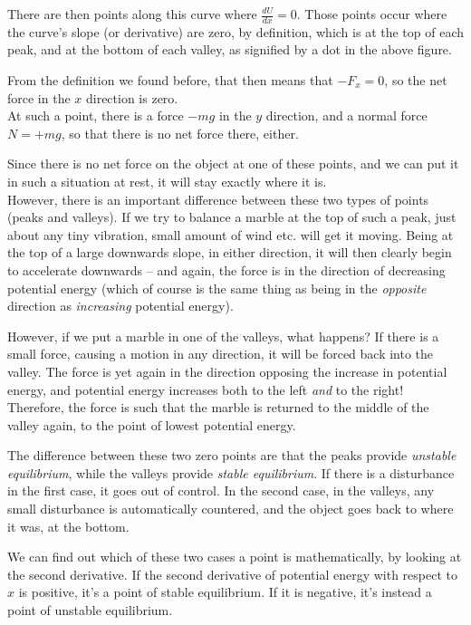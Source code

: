 \documentclass[8.01x]{subfiles}
\begin{document}
There are then points along this curve where $\displaystyle \frac{dU}{dx} = 0$. Those points occur where the curve's slope (or derivative) are zero, by definition, which is at the top of each peak, and at the bottom of each valley, as signified by a dot in the above figure.

From the definition we found before, that then means that $-F_x = 0$, so the net force in the $x$ direction is zero.\\
At such a point, there is a force $-m g$ in the $y$ direction, and a normal force $N = + m g$, so that there is no net force there, either.

Since there is no net force on the object at one of these points, and we can put it in such a situation at rest, it will stay exactly where it is.\\
However, there is an important difference between these two types of points  (peaks and valleys). If we try to balance a marble at the top of such a peak, just about any tiny vibration, small amount of wind etc. will get it moving. Being at the top of a large downwards slope, in either direction, it will then clearly begin to accelerate downwards -- and again, the force is in the direction of decreasing potential energy (which of course is the same thing as being in the \emph{opposite} direction as \emph{increasing} potential energy).

However, if we put a marble in one of the valleys, what happens? If there is a small force, causing a motion in any direction, it will be forced back into the valley. The force is yet again in the direction opposing the increase in potential energy, and potential energy increases both to the left \emph{and} to the right! Therefore, the force is such that the marble is returned to the middle of the valley again, to the point of lowest potential energy.

The difference between these two zero points are that the peaks provide \emph{unstable equilibrium}, while the valleys provide \emph{stable equilibrium}. If there is a disturbance in the first case, it goes out of control. In the second case, in the valleys, any small disturbance is automatically countered, and the object goes back to where it was, at the bottom.

We can find out which of these two cases a point is mathematically, by looking at the second derivative. If the second derivative of potential energy with respect to $x$ is positive, it's a point of stable equilibrium. If it is negative, it's instead a point of unstable equilibrium.
\end{document}
